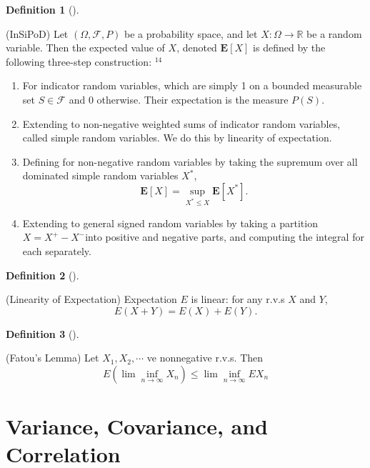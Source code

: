 \documentclass[
  letterpaper,
  DIV=11,
  numbers=noendperiod]{scrreprt}
\theoremstyle{definition}
\newtheorem{definition}{Definition}[chapter]
\theoremstyle{plain}
\theoremstyle{remark}
\begin{document}
\leavevmode{}%
\begin{definition}[]\label{def-InSiPoD}

(InSiPoD) Let \((\Omega, \mathcal{F}, P)\) be a probability space, and
let \(X: \Omega \rightarrow \mathbb{R}\) be a random variable. Then the
expected value of \(X\), denoted \(\mathbf{E}[X]\) is defined by the
following three-step construction: \({ }^{14}\)

\begin{enumerate}
\def\labelenumi{\arabic{enumi}.}
\item
  For indicator random variables, which are simply 1 on a bounded
  measurable set \(S \in \mathcal{F}\) and 0 otherwise. Their
  expectation is the measure \(P(S)\).
\item
  Extending to non-negative weighted sums of indicator random variables,
  called simple random variables. We do this by linearity of
  expectation.
\item
  Defining for non-negative random variables by taking the supremum over
  all dominated simple random variables \(X^*\), \[
  \mathbf{E}[X]=\sup _{X^* \leq X} \mathbf{E}\left[X^*\right] .
  \]
\item
  Extending to general signed random variables by taking a partition
  \(X=X^{+}-X^{-}\)into positive and negative parts, and computing the
  integral for each separately.
\end{enumerate}

\end{definition}

\leavevmode{}%
\begin{definition}[]\label{def-linearity}

(Linearity of Expectation) Expectation \(E\) is linear: for any r.v.s
\(X\) and \(Y\), \[E(X+Y)=E(X)+E(Y).\]

\end{definition}

\leavevmode{}%
\begin{definition}[]\label{def-fatou-lemma}

(Fatou's Lemma) Let \(X_1, X_2, \cdots\) ve nonnegative r.v.s. Then
\[E(\lim \inf_{n\rightarrow\infty}X_n) \leq \lim \inf_{n\rightarrow\infty}EX_n\]

\end{definition}

\hypertarget{variance-covariance-and-correlation}{%
\section*{Variance, Covariance, and
Correlation}\label{variance-covariance-and-correlation}}
\end{document}
